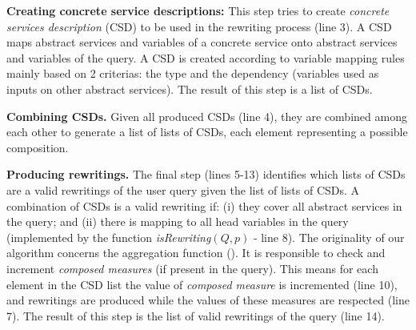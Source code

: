 \noindent \textbf{Creating concrete service descriptions:} This step tries to create \textit{concrete services description} (CSD) to be
 used in the rewriting process (line 3). A CSD maps abstract services and
 variables of a concrete service onto abstract services and variables of the
 query. A CSD is created 
according to variable mapping rules mainly based on 2 criterias: the type and the dependency (variables used as inputs on other abstract services). 
The  result of this step is a list of CSDs.
  

 
\noindent \textbf{Combining CSDs.} Given all produced CSDs  (line
4), they are combined among each other to generate  a list of lists of CSDs, each element representing a possible composition.

\noindent \textbf{Producing rewritings.} The final step (lines 5-13) identifies which lists of CSDs are a valid
rewritings of the user query given the list of lists of CSDs.
A combination of CSDs is a valid rewriting if: (i) they cover all abstract services in the query; and 
(ii) there is mapping to all head variables in the query (implemented by the function \textit{isRewriting}$(Q, p)$ - line 8).
The originality of our algorithm concerns the aggregation function ().
It is responsible to check and increment \textit{composed measures} (if present in the query). 
This means for each element in the CSD list the value of \textit{composed measure} is incremented (line 10), and rewritings are produced while the values of these measures are respected (line 7). 
The result of this step is the list of valid 
 rewritings of the query (line 14).%
